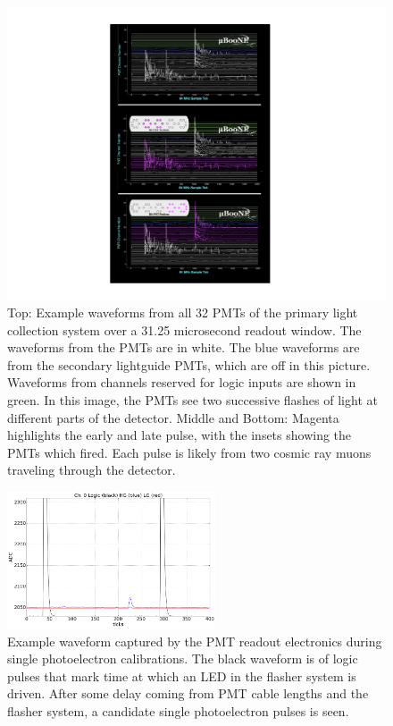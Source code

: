 \begin{figure}[t]
\centering 
\includegraphics[height=0.7\textheight]{./light_figures/eventtriplet.pdf}
\caption{Top:  Example waveforms from all 32 PMTs of the primary light collection system over a 31.25 microsecond readout window.  The waveforms from the PMTs are in white.  The blue waveforms are from the secondary lightguide PMTs, which are off in this picture.  Waveforms from channels reserved for logic inputs are shown in green.  In this image, the PMTs see two successive flashes of light at different parts of the detector.  Middle and Bottom:   Magenta highlights the early and late pulse, with the insets showing the PMTs which fired.   Each pulse is likely from two cosmic ray muons traveling through the detector.}
 \label{fig:example_readout}
 \end{figure}

\begin{figure}[t]
\centering 
\includegraphics[width=0.55\textwidth]{./light_figures/sample_flasher_spe.png}
\caption{Example waveform captured by the PMT readout electronics during single photoelectron calibrations.  The black waveform is of logic pulses that mark time at which an LED in the flasher system is driven.  After some delay coming from PMT cable lengths and the flasher system, a candidate single photoelectron pulses is seen.}
 \label{fig:example_spe_wfm}
 \end{figure}


